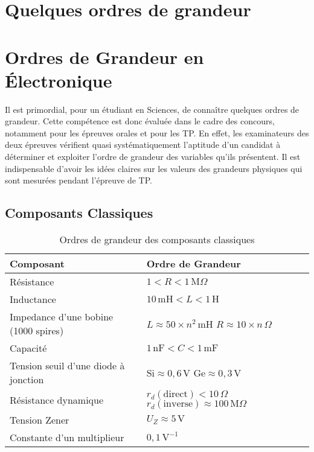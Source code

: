 \documentclass[10pt]{article}
\begin{document}
\begin{multicols}{2}
\section{Quelques ordres de grandeur}

\section*{Ordres de Grandeur en Électronique}

Il est primordial, pour un étudiant en Sciences, de connaître quelques ordres de grandeur. Cette compétence est donc évaluée dans le cadre des concours, notamment pour les épreuves orales et pour les TP. En effet, les examinateurs des deux épreuves vérifient quasi systématiquement l’aptitude d’un candidat à déterminer et exploiter l’ordre de grandeur des variables qu’ils présentent. Il est indispensable d’avoir les idées claires sur les valeurs des grandeurs physiques qui sont mesurées pendant l’épreuve de TP.

\subsection{Composants Classiques}

\begin{table}[H]
\centering
\caption{Ordres de grandeur des composants classiques}
\begin{tabular}{|l|l|}
\hline
\textbf{Composant} & \textbf{Ordre de Grandeur} \\ \hline
Résistance & \(1 < R < 1\,\text{M}\Omega\) \\ \hline
Inductance & \(10\,\text{mH} < L < 1\,\text{H}\) \\ \hline
Impedance d’une bobine (1000 spires) & \(L \approx 50 \times n^2\,\text{mH}\) \newline \(R \approx 10 \times n\,\Omega\) \\ \hline
Capacité & \(1\,\text{nF} < C < 1\,\text{mF}\) \\ \hline
Tension seuil d’une diode à jonction & \(\text{Si} \approx 0,6\,\text{V}\) \newline \(\text{Ge} \approx 0,3\,\text{V}\) \\ \hline
Résistance dynamique & \(r_d(\text{direct}) < 10\,\Omega\) \newline \(r_d(\text{inverse}) \approx 100\,\text{M}\Omega\) \\ \hline
Tension Zener & \(U_Z \approx 5\,\text{V}\) \\ \hline
Constante d’un multiplieur & \(0,1\,\text{V}^{-1}\) \\ \hline
\end{tabular}
\end{table}


\end{multicols}
\end{document}
